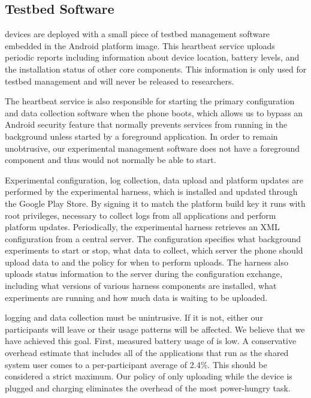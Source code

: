 \subsection{Testbed Software}

\PhoneLab{} devices are deployed with a small piece of testbed management
software embedded in the Android platform image. This heartbeat service
uploads periodic reports including information about device location, battery
levels, and the installation status of other core \PhoneLab{} components.
This information is only used for testbed management and will never be
released to researchers.

The heartbeat service is also responsible for starting the primary
\PhoneLab{} configuration and data collection software when the phone boots,
which allows us to bypass an Android security feature that normally prevents
services from running in the background unless started by a foreground
application. In order to remain unobtrusive, our experimental management
software does not have a foreground component and thus would not normally be
able to start.

Experimental configuration, log collection, data upload and platform updates
are performed by the \PhoneLab{} experimental harness, which is installed and
updated through the Google Play Store. By signing it to match the platform
build key it runs with root privileges, necessary to collect logs from all
applications and perform platform updates. Periodically, the experimental
harness retrieves an XML configuration from a central \PhoneLab{} server. The
configuration specifies what background experiments to start or stop, what
data to collect, which server the phone should upload data to and the policy
for when to perform uploads. The \PhoneLab{} harness also uploads status
information to the server during the configuration exchange, including what
versions of various harness components are installed, what experiments are
running and how much data is waiting to be uploaded.

\PhoneLab{} logging and data collection must be unintrusive. If it is not,
either our participants will leave or their usage patterns will be affected.
We believe that we have achieved this goal. First, measured battery usage of
\PhoneLab{} is low. A conservative overhead estimate that includes all of the
applications that run as the shared system user comes to a per-participant
average of 2.4\%. This should be considered a strict maximum. Our policy of
only uploading while the device is plugged and charging eliminates the
overhead of the most power-hungry task.


